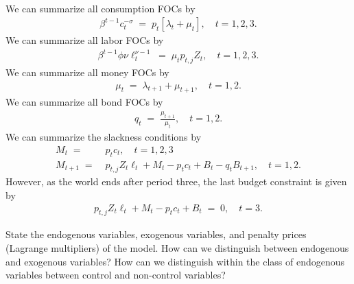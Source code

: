 \documentclass[a4paper, 12pt]{article}
\begin{document}
\begin{Answer}
\begin{small}
\begin{align}
	\end{align}%
	We can summarize all consumption FOCs by%
	\begin{align}%
		\beta^{t-1} c_t^{-\sigma} \; = \; p_t \left[ \lambda_t + \mu_t \right], \quad t = 1,2,3.%
	\end{align}%
	We can summarize all labor FOCs by%
	\begin{align}%
		\beta^{t-1} \phi \nu \ell_t^{\nu-1} \; = \; \mu_t p_{t,j} Z_t, \quad t = 1,2,3.%
	\end{align}%
	We can summarize all money FOCs by%
	\begin{align}%
		\mu_t \; = \; \lambda_{t+1} + \mu_{t+1}, \quad t = 1,2.\label{eq:money}%
	\end{align}%
	We can summarize all bond FOCs by%
	\begin{align}%
		q_t \; = \; \frac{\mu_{t+1}}{\mu_t}, \quad t = 1,2.\label{eq:bond}%
	\end{align}%
	We can summarize the slackness conditions by%
	\begin{align}%
		M_t \; = & \; p_t c_t, \quad t = 1,2,3\\%
		M_{t+1} \; = & \; p_{t,j} Z_t \ell_t + M_t - p_t c_t + B_t - q_t B_{t+1}, \quad t = 1,2.%
	\end{align}%
	However, as the world ends after period three, the last budget constraint is given by%
	\begin{align}%
		p_{t,j} Z_t \ell_t + M_t -p_t c_t + B_t \; = \; 0, \quad t=3.%
	\end{align}%
	\end{small}%
\end{Answer}%
\bigskip%
\begin{Exercise}[title={Variables and economic interpretation},label=ex_2]%
	State the endogenous variables, exogenous variables, and penalty prices (Lagrange multipliers) of the model. How can we distinguish between endogenous and exogenous variables? How can we distinguish within the class of endogenous variables between control and non-control variables?%
\end{Exercise}%
\bigskip%
\end{document}
